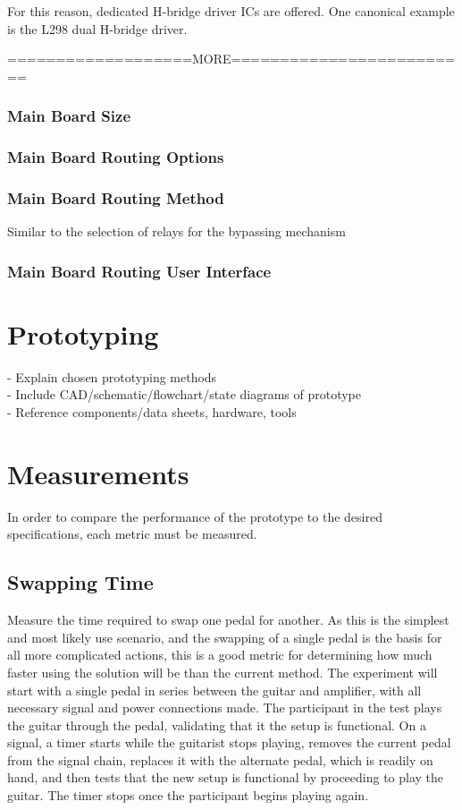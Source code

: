\documentclass{article}
\begin{document}
		For this reason, dedicated H-bridge driver ICs are offered.  One canonical example is the L298 dual H-bridge driver.  

		===================MORE=========================

		\subsubsection{Main Board Size}
		\subsubsection{Main Board Routing Options}
		\subsubsection{Main Board Routing Method}
		Similar to the selection of relays for the bypassing mechanism 

		\subsubsection{Main Board Routing User Interface}

\section{Prototyping}
	- Explain chosen prototyping methods \\
	- Include CAD/schematic/flowchart/state diagrams of prototype \\
	- Reference components/data sheets, hardware, tools \\
\section{Measurements}
	In order to compare the performance of the prototype to the desired specifications, each metric must be measured.

	\subsection{Swapping Time}
	Measure the time required to swap one pedal for another.  As this is the simplest and most likely use scenario, and the swapping of a single pedal is the basis for all more complicated actions, this is a good metric for determining how much faster using the solution will be than the current method.  The experiment will start with a single pedal in series between the guitar and amplifier, with all necessary signal and power connections made.  The participant in the test plays the guitar through the pedal, validating that it the setup is functional.  On a signal, a timer starts while the guitarist stops playing, removes the current pedal from the signal chain, replaces it with the alternate pedal, which is readily on hand, and then tests that the new setup is functional by proceeding to play the guitar.  The timer stops once the participant begins playing again.
\end{document}
